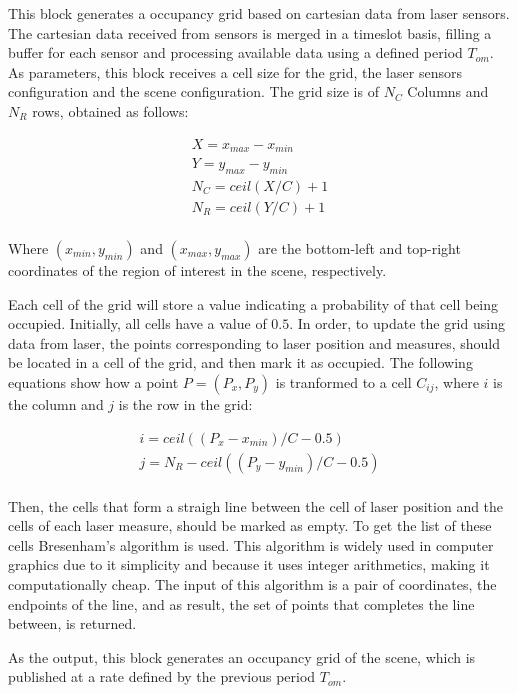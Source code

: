 \begin{description}
This block generates a occupancy grid based on cartesian data from laser sensors. The cartesian data received from sensors is merged in a timeslot basis, filling a buffer for each sensor and processing available data using a defined period $T_{om}$. As parameters, this block receives a cell size for the grid, the laser sensors configuration and the scene configuration. The grid size is of $N_C$ Columns and $N_R$ rows, obtained as follows:

\begin{eqnarray*}
X = x_{max}-x_{min} \\
Y = y_{max}-y_{min} \\
N_C = ceil(X/C)+1 \\
N_R = ceil(Y/C)+1 \\
\end{eqnarray*}

Where $(x_{min}, y_{min})$ and $(x_{max}, y_{max})$ are the bottom-left and top-right coordinates of the region of interest in the scene, respectively.

Each cell of the grid will store a value indicating a probability of that cell being occupied. Initially, all cells have a value of $0.5$. In order, to update the grid using data from laser, the points corresponding to laser position and measures, should be located in a cell of the grid, and then mark it as occupied. The following equations show how a point $P = (P_x, P_y)$ is tranformed to a cell $C_{ij}$, where $i$ is the column and $j$ is the row in the grid:

\begin{eqnarray*}
i = ceil((P_x - x_{min})/C - 0.5) \\
j = N_R - ceil((P_y - y_{min})/C - 0.5) \\
\end{eqnarray*}

Then, the cells that form a straigh line between the cell of laser position and the cells of each laser measure, should be marked as empty. To get the list of these cells Bresenham's algorithm is used. This algorithm is widely used in computer graphics due to it simplicity and because it uses integer arithmetics, making it computationally cheap. The input of this algorithm is a pair of coordinates, the endpoints of the line, and as result, the set of points that completes the line between, is returned.

As the output, this block generates an occupancy grid of the scene, which is published at a rate defined by the previous period $T_{om}$.



\end{description}
